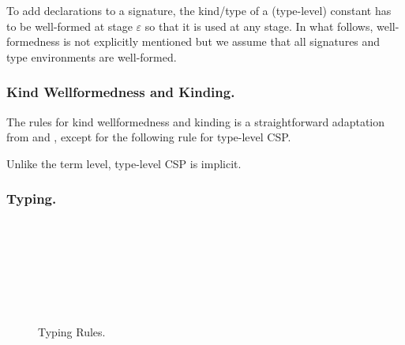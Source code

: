 To add declarations to a signature, the kind/type of a (type-level)
constant has to be well-formed at stage \(\varepsilon\) so that it is
used at any stage.  In what follows, well-formedness is not explicitly
mentioned but we assume that all signatures and type environments are
well-formed.

\subsubsection{Kind Wellformedness and Kinding.}

The rules for kind wellformedness and kinding is a straightforward
adaptation from \LLF and \LTP, except for the following rule for type-level CSP.
\begin{center}
\end{center}
Unlike the term level, type-level CSP is implicit.

\subsubsection{Typing.}

\begin{figure}[tbp]
  \begin{center}
     \hfil
     \\[2mm]
     \\[2mm]
     \\[2mm]
     \\[2mm]
     \andalso
     \\[2mm]
     \\[2mm]
     \andalso
    \caption{Typing Rules.}
    \label{fig:typing-rules}
  \end{center}
\end{figure}

